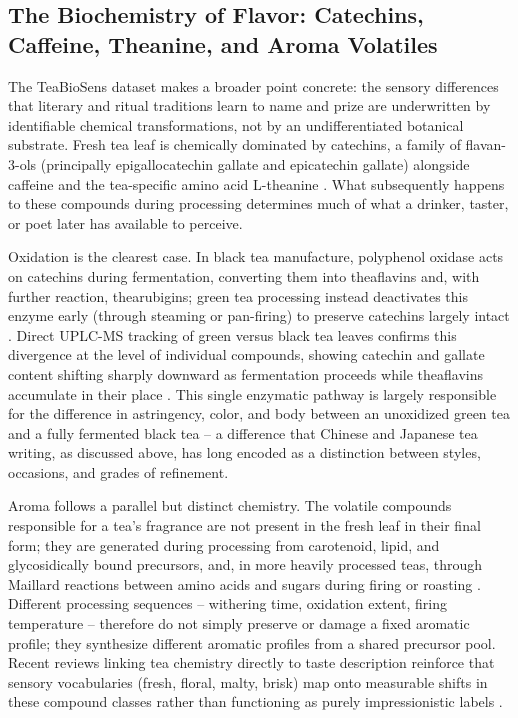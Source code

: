 \documentclass[numbers]{IntechOpen-Book}
\begin{document}
\subsection{The Biochemistry of Flavor: Catechins, Caffeine, Theanine, and Aroma Volatiles}

The TeaBioSens dataset makes a broader point concrete: the sensory differences that literary and ritual traditions learn to name and prize are underwritten by identifiable chemical transformations, not by an undifferentiated botanical substrate. Fresh tea leaf is chemically dominated by catechins, a family of flavan-3-ols (principally epigallocatechin gallate and epicatechin gallate) alongside caffeine and the tea-specific amino acid L-theanine \cite{sang2011}. What subsequently happens to these compounds during processing determines much of what a drinker, taster, or poet later has available to perceive.

Oxidation is the clearest case. In black tea manufacture, polyphenol oxidase acts on catechins during fermentation, converting them into theaflavins and, with further reaction, thearubigins; green tea processing instead deactivates this enzyme early (through steaming or pan-firing) to preserve catechins largely intact \cite{sang2011,lee2019}. Direct UPLC-MS tracking of green versus black tea leaves confirms this divergence at the level of individual compounds, showing catechin and gallate content shifting sharply downward as fermentation proceeds while theaflavins accumulate in their place \cite{lee2019}. This single enzymatic pathway is largely responsible for the difference in astringency, color, and body between an unoxidized green tea and a fully fermented black tea -- a difference that Chinese and Japanese tea writing, as discussed above, has long encoded as a distinction between styles, occasions, and grades of refinement.

Aroma follows a parallel but distinct chemistry. The volatile compounds responsible for a tea's fragrance are not present in the fresh leaf in their final form; they are generated during processing from carotenoid, lipid, and glycosidically bound precursors, and, in more heavily processed teas, through Maillard reactions between amino acids and sugars during firing or roasting \cite{ho2015}. Different processing sequences -- withering time, oxidation extent, firing temperature -- therefore do not simply preserve or damage a fixed aromatic profile; they synthesize different aromatic profiles from a shared precursor pool. Recent reviews linking tea chemistry directly to taste description reinforce that sensory vocabularies (fresh, floral, malty, brisk) map onto measurable shifts in these compound classes rather than functioning as purely impressionistic labels \cite{zhang2020}.
\end{document}
